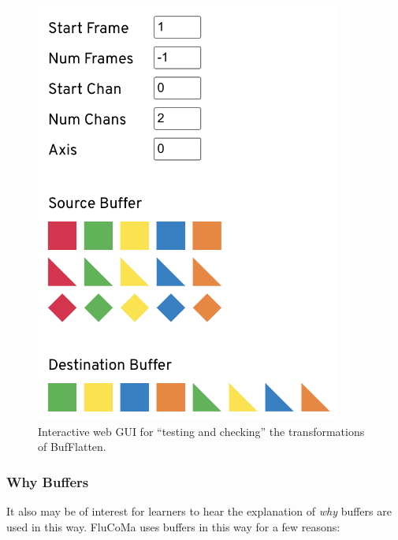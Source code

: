\documentclass{article}
\begin{document}
\begin{figure}[H]
\centering
\includegraphics[width=0.9\textwidth]{./figures/bufflatten.png}
\caption{Interactive web GUI for ``testing and checking'' the transformations of BufFlatten.}
\label{fig:buf-flatten}
\end{figure}

\subsubsection{Why Buffers}

It also may be of interest for learners to hear the explanation of
\emph{why} buffers are used in this way. FluCoMa uses buffers in this
way for a few reasons:
\end{document}
